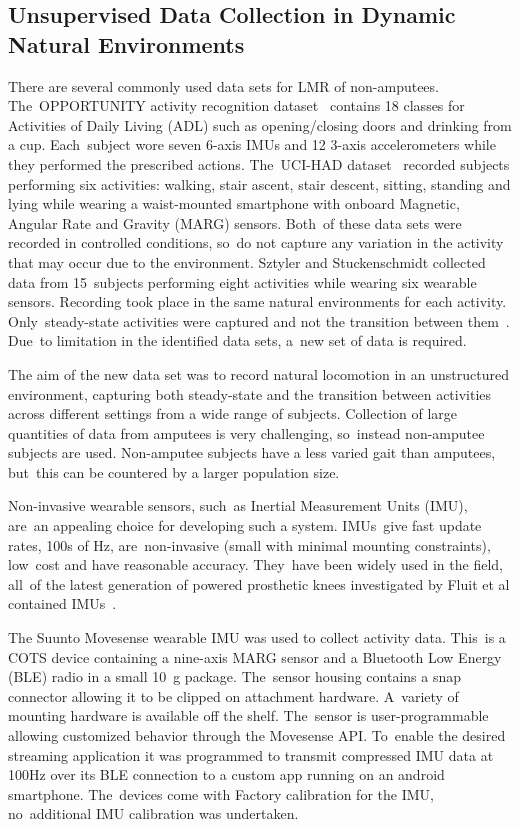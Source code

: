 \subsection{Unsupervised Data Collection in Dynamic Natural Environments}
\label{sec:data_collection}
There are several commonly used data sets for LMR of non-amputees. The~OPPORTUNITY activity recognition dataset~\cite{roggan2010} contains 18  classes for Activities of Daily Living (ADL) such as opening/closing doors and drinking from a cup. Each~subject wore seven 6-axis IMUs and 12 3-axis accelerometers while they performed the prescribed actions. The~UCI-HAD dataset~\cite{Anguita2013} recorded subjects performing six activities: walking, stair ascent, stair descent, sitting, standing and lying while wearing a waist-mounted smartphone with onboard Magnetic, Angular Rate and Gravity (MARG) sensors. Both~of these data sets were recorded in controlled conditions, so~do not capture any variation in the activity that may occur due to the environment. Sztyler and Stuckenschmidt collected data from 15~subjects performing eight activities while wearing six wearable sensors. Recording took place in the same natural environments for each activity. Only~steady-state activities were captured and not the transition between them~\cite{Sztyler2017}. Due~to limitation in the identified data sets, a~new set of data is required. 

The aim of the new data set was to record natural locomotion in an unstructured environment, capturing both steady-state and the transition between activities across different settings from a wide range of subjects. Collection of large quantities of data from amputees is very challenging, so~instead non-amputee subjects are used. Non-amputee subjects have a less varied gait than amputees, but~this can be countered by a larger population size.

Non-invasive wearable sensors, such~as Inertial Measurement Units (IMU), are~an appealing choice for developing such a system. IMUs~give fast update rates, 100s of Hz, are~non-invasive (small with minimal mounting constraints), low~cost and have reasonable accuracy. They~have been widely used in the field, all~of the latest generation of powered prosthetic knees investigated by Fluit et al contained IMUs~\cite{Fluit2020}.

The Suunto Movesense wearable IMU was used to collect activity data. This~is a COTS device containing a nine-axis MARG sensor and a Bluetooth Low Energy (BLE) radio in a small 10~g package. The~sensor housing contains a snap connector allowing it to be clipped on attachment hardware. A~variety of mounting hardware is available off the shelf. The~sensor is user-programmable allowing customized behavior through the Movesense API. To~enable the desired streaming application it was programmed to transmit compressed IMU data at 100Hz over its BLE connection to a custom app running on an android smartphone. The~devices come with Factory calibration for the IMU, no~additional IMU calibration was undertaken.

